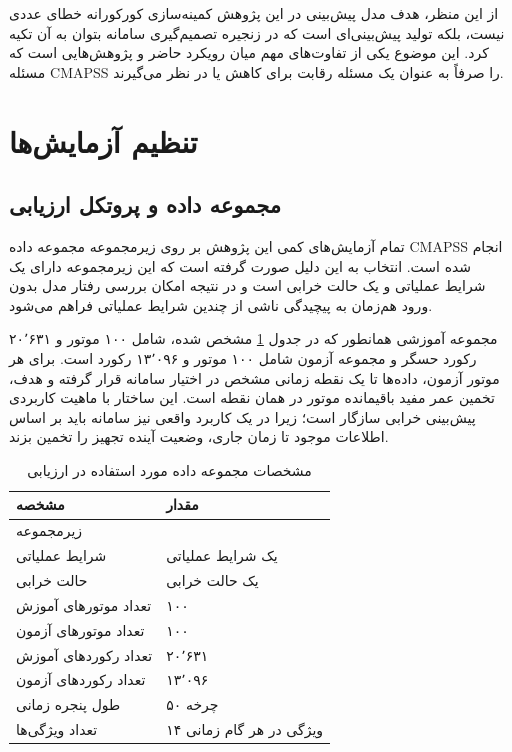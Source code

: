 از این منظر، هدف مدل پیش‌بینی در این پژوهش کمینه‌سازی کورکورانه خطای عددی نیست، بلکه تولید پیش‌بینی‌ای است که در زنجیره تصمیم‌گیری سامانه بتوان به آن تکیه کرد. این موضوع یکی از تفاوت‌های مهم میان رویکرد حاضر و پژوهش‌هایی است که مسئله CMAPSS را صرفاً به عنوان یک مسئله رقابت برای کاهش  یا  در نظر می‌گیرند.

\section{تنظیم آزمایش‌ها}
\label{sec:experiment-setup}

\subsection{مجموعه داده و پروتکل ارزیابی}

تمام آزمایش‌های کمی این پژوهش بر روی زیرمجموعه  مجموعه داده \gls{CMAPSS} انجام شده است. انتخاب  به این دلیل صورت گرفته است که این زیرمجموعه دارای یک شرایط عملیاتی و یک حالت خرابی است و در نتیجه امکان بررسی رفتار مدل بدون ورود هم‌زمان به پیچیدگی ناشی از چندین شرایط عملیاتی فراهم می‌شود.

مجموعه آموزشی همانطور که در جدول 
\ref{tab:eval-data}
مشخص شده،
شامل ۱۰۰ موتور و ۲۰٬۶۳۱ رکورد حسگر و مجموعه آزمون شامل ۱۰۰ موتور و ۱۳٬۰۹۶ رکورد است. برای هر موتور آزمون، داده‌ها تا یک نقطه زمانی مشخص در اختیار سامانه قرار گرفته و هدف، تخمین عمر مفید باقیمانده موتور در همان نقطه است. این ساختار با ماهیت کاربردی پیش‌بینی خرابی سازگار است؛ زیرا در یک کاربرد واقعی نیز سامانه باید بر اساس اطلاعات موجود تا زمان جاری، وضعیت آینده تجهیز را تخمین بزند.

\begin{table}[ht]
	\centering
	\caption{مشخصات مجموعه داده مورد استفاده در ارزیابی}
	\label{tab:eval-data}
	\begin{tabular}{p{5cm}p{6cm}}
		\toprule
		\textbf{مشخصه} & \textbf{مقدار} \\
		\midrule
		زیرمجموعه & \lr{FD001} \\
		شرایط عملیاتی & یک شرایط عملیاتی \\
		حالت خرابی & یک حالت خرابی \\
		تعداد موتورهای آموزش & ۱۰۰ \\
		تعداد موتورهای آزمون & ۱۰۰ \\
		تعداد رکوردهای آموزش & ۲۰٬۶۳۱ \\
		تعداد رکوردهای آزمون & ۱۳٬۰۹۶ \\
		طول پنجره زمانی & ۵۰ چرخه \\
		تعداد ویژگی‌ها & ۱۴ ویژگی در هر گام زمانی \\
		\bottomrule
	\end{tabular}
\end{table}

